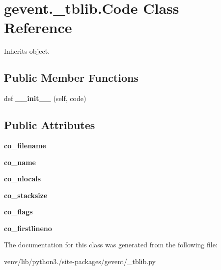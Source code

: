 \hypertarget{classgevent_1_1__tblib_1_1_code}{}\section{gevent.\+\_\+tblib.\+Code Class Reference}
\label{classgevent_1_1__tblib_1_1_code}


Inherits object.

\subsection*{Public Member Functions}
\begin{DoxyCompactItemize}
\item 
\mbox{\label{classgevent_1_1__tblib_1_1_code_a14a0f45f10b5af6ec3fbeafe3eb7729a}} 
def {\bfseries \+\_\+\+\_\+init\+\_\+\+\_\+} (self, code)
\end{DoxyCompactItemize}
\subsection*{Public Attributes}
\begin{DoxyCompactItemize}
\item 
\mbox{\label{classgevent_1_1__tblib_1_1_code_a6370ff5157344322b30c1372f2f56d1b}} 
{\bfseries co\+\_\+filename}
\item 
\mbox{\label{classgevent_1_1__tblib_1_1_code_add416335a715dab4c169d186a70edfcb}} 
{\bfseries co\+\_\+name}
\item 
\mbox{\label{classgevent_1_1__tblib_1_1_code_ab76964b2338d4486c15ebde31f44e4cc}} 
{\bfseries co\+\_\+nlocals}
\item 
\mbox{\label{classgevent_1_1__tblib_1_1_code_a0c68753097e411af3a6439e2c5b95211}} 
{\bfseries co\+\_\+stacksize}
\item 
\mbox{\label{classgevent_1_1__tblib_1_1_code_a113cef1abf7de38be251fe1e41eb0443}} 
{\bfseries co\+\_\+flags}
\item 
\mbox{\label{classgevent_1_1__tblib_1_1_code_a4fcf2d61a12a362b52a254cdc8d2f3f6}} 
{\bfseries co\+\_\+firstlineno}
\end{DoxyCompactItemize}


The documentation for this class was generated from the following file\+:\begin{DoxyCompactItemize}
\item 
venv/lib/python3./site-\/packages/gevent/\+\_\+tblib.\+py\end{DoxyCompactItemize}
